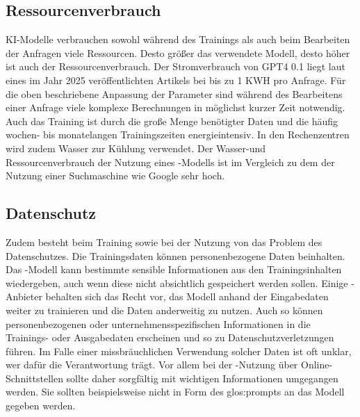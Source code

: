 \documentclass[../main.tex]{subfiles}
\begin{document}
\subsection{Ressourcenverbrauch}

KI-Modelle verbrauchen sowohl während des Trainings als auch beim Bearbeiten der Anfragen viele Ressourcen. Desto größer das verwendete Modell, desto höher ist auch der Ressourcenverbrauch. 
Der Stromverbrauch von GPT4 0.1 liegt laut eines im Jahr 2025 veröffentlichten Artikels bei bis zu 1 KWH pro Anfrage\cite{Energieverbrauch}. Für die oben beschriebene Anpassung der Parameter sind während des Bearbeitens einer Anfrage viele 
komplexe Berechnungen in möglichst kurzer Zeit notwendig. Auch das Training ist durch die große Menge benötigter Daten und die häufig wochen- bis monatelangen Trainingszeiten 
energieintensiv. In den Rechenzentren wird zudem Wasser zur Kühlung verwendet. Der Wasser-und Ressourcenverbrauch der Nutzung eines -Modells ist im Vergleich zu dem der Nutzung einer 
Suchmaschine wie Google sehr hoch\cite{KINachhaltigkeit}. 

\subsection{Datenschutz}

Zudem besteht beim Training sowie bei der Nutzung von  das Problem des Datenschutzes. Die Trainingsdaten können personenbezogene Daten beinhalten. Das -Modell kann bestimmte sensible 
Informationen aus den Trainingsinhalten wiedergeben, auch wenn diese nicht absichtlich gespeichert werden sollen. Einige -Anbieter behalten sich das Recht vor, das Modell anhand der 
Eingabedaten weiter zu trainieren und die Daten anderweitig zu nutzen. Auch so können personenbezogenen oder unternehmensspezifischen Informationen in die Trainings- oder Ausgabedaten 
erscheinen und so zu Datenschutzverletzungen führen. Im Falle einer missbräuchlichen Verwendung solcher Daten ist oft unklar, wer dafür die Verantwortung trägt. Vor allem bei der -Nutzung 
über Online-Schnittstellen sollte daher sorgfältig mit wichtigen Informationen umgegangen werden. Sie sollten beispielsweise nicht in Form des \gls{glos:prompt}s an das Modell gegeben werden.
\end{document}
